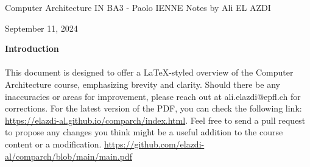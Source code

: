 
\begin{titlepage}
    \centering
    \vspace*{1cm}
    \Huge
    Computer Architecture \newline
    \vspace{10px}
    \LARGE IN BA3 - Paolo IENNE
    \vspace*{10px}
    \newline
    \Large Notes by Ali EL AZDI

    \vfill
    \large
    September 11, 2024
\end{titlepage}

\begin{center}
    \vspace*{1cm}
    \textbf{Introduction}
    \newline
    \paragraph[short]{}{This document is designed to offer a LaTeX-styled overview of the Computer Architecture course, emphasizing brevity and clarity. Should there be any inaccuracies or areas for improvement, please reach out at ali.elazdi@epfl.ch for corrections. For the latest version of the PDF, you can check the following link: 
    \url{https://elazdi-al.github.io/comparch/index.html}. Feel free to send a pull request to propose any changes you think might be a useful addition to the course content or a modification.}
    \newline
   \url{
        https://github.com/elazdi-al/comparch/blob/main/main.pdf
    }
    \newline
\end{center}


\tableofcontents

